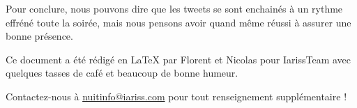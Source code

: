 \documentclass[12pt, a4paper]{article}
\newcommand{\espace}{\vspace{.8cm}}
\newcommand{\authors}{Florent et Nicolas}
\begin{document}
Pour conclure, nous pouvons dire que les tweets se sont enchainés à un rythme effréné toute la soirée, mais nous pensons avoir quand même réussi à assurer une bonne présence.



\espace\vfill{}
Ce document a été rédigé en \LaTeX{} par \authors{} pour IarissTeam avec quelques tasses de café et beaucoup de bonne humeur.

Contactez-nous à \href{mailto:nuitinfo@iariss.com}{nuitinfo@iariss.com} pour tout renseignement supplémentaire !
\end{document}
